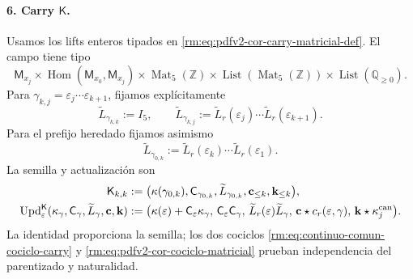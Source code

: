 \paragraph{6. Carry \(\mathsf K\).}
Usamos los lifts enteros tipados en
\eqref{rm:eq:pdfv2-cor-carry-matricial-def}. El campo tiene tipo
\[
 \mathsf M_{x_j}\times
 \operatorname{Hom}(\mathsf M_{x_0},\mathsf M_{x_j})
 \times\operatorname{Mat}_5(\mathbb Z)
 \times\operatorname{List}(\operatorname{Mat}_5(\mathbb Z))
 \times\operatorname{List}(\mathbb Q_{\geq0}).
\]
Para \(\gamma_{k,j}=\varepsilon_j\cdots\varepsilon_{k+1}\), fijamos
explícitamente
\begin{equation}
\label{rm:eq:pdfv2-terminal-lift-entero-ruta}
 \widetilde L_{\gamma_{k,k}}:=I_5,\qquad
 \widetilde L_{\gamma_{k,j}}
 :=\widetilde L_r(\varepsilon_j)\cdots
   \widetilde L_r(\varepsilon_{k+1}).
\end{equation}
Para el prefijo heredado fijamos asimismo
\[
 \widetilde L_{\gamma_{0,k}}
 :=\widetilde L_r(\varepsilon_k)\cdots
   \widetilde L_r(\varepsilon_1).
\]
La semilla y actualización son
\begin{align}
 \mathsf K_{k,k}&:=
 \bigl(\kappa(\gamma_{0,k}),\mathsf C_{\gamma_{0,k}},
       \widetilde L_{\gamma_{0,k}},
       \mathbf c_{\leq k},\mathbf k_{\leq k}\bigr),
 \label{rm:eq:pdfv2-terminal-semilla-k}\\
 \operatorname{Upd}^{\mathsf K}_{\varepsilon}
 (\kappa_\gamma,\mathsf C_\gamma,\widetilde L_\gamma,
   \mathbf c,\mathbf k)
 &:=
 \bigl(\kappa(\varepsilon)+\mathsf C_\varepsilon\kappa_\gamma,\,
 \mathsf C_\varepsilon\mathsf C_\gamma,\,
 \widetilde L_r(\varepsilon)\widetilde L_\gamma,\,
 \mathbf c\star c_r(\varepsilon,\gamma),\,
 \mathbf k\star\kappa_j^{\rm can}\bigr).
 \label{rm:eq:pdfv2-terminal-update-k}
\end{align}
La identidad proporciona la semilla; los dos cociclos
\eqref{rm:eq:continuo-comun-cociclo-carry} y
\eqref{rm:eq:pdfv2-cor-cociclo-matricial} prueban independencia del
parentizado y naturalidad.


